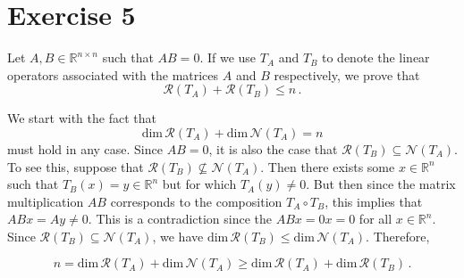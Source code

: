 \documentclass[11pt]{article}
\begin{document}
\section*{Exercise 5}

Let $A,B \in \mathbb{R}^{n \times n}$ such that $AB = 0$. If we use $T_A$ and $T_B$ to denote the linear operators associated with the matrices $A$ and $B$ respectively, we prove that $$\mathcal{R}(T_A) + \mathcal{R}(T_B) \leq n \,.$$

We start with the fact that $$\text{dim} \,\mathcal{R}(T_A) + \text{dim} \,\mathcal{N}(T_A) = n$$
must hold in any case. Since $AB = 0$, it is also the case that $\mathcal{R}(T_B) \subseteq \mathcal{N}(T_A)$. To see this, suppose that $\mathcal{R}(T_B) \not\subseteq \mathcal{N}(T_A)$. Then there exists some $x \in \mathbb{R}^n$ such that $T_B(x) = y \in \mathbb{R}^n$ but for which $T_A(y) \neq 0$. But then since the matrix multiplication $AB$ corresponds to the composition $T_A \circ T_B$, this implies that $ABx = Ay \neq 0$. This is a contradiction since the $ABx = 0x = 0$ for all $x \in \mathbb{R}^n$. Since $\mathcal{R}(T_B) \subseteq \mathcal{N}(T_A)$, we have $\text{dim} \,\mathcal{R}(T_B) \leq \text{dim} \, \mathcal{N}(T_A)$. Therefore,

$$n = \text{dim} \,\mathcal{R}(T_A) + \text{dim} \,\mathcal{N}(T_A) \geq \text{dim} \,\mathcal{R}(T_A) + \text{dim} \,\mathcal{R}(T_B)\,. $$
\end{document}

